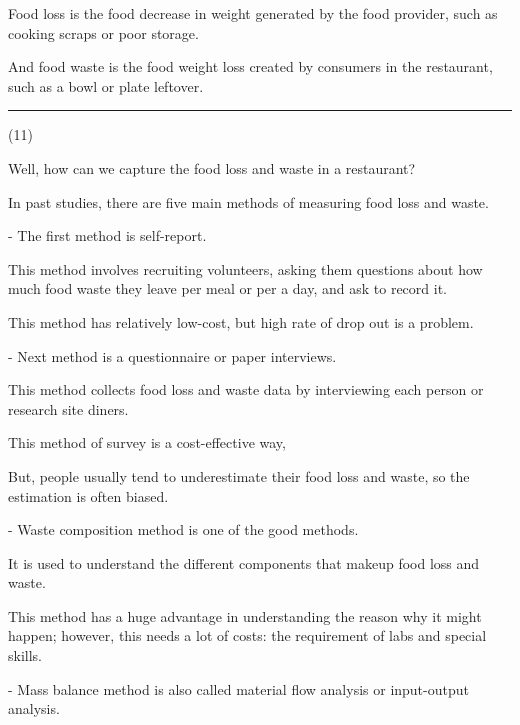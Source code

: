 \documentclass{article}
\begin{document}
\begin{multicols}{2}
\begin{spacing}{1.1}
\vspace{1em}

Food loss is the food decrease in weight generated by the food provider, 
such as cooking scraps or poor storage.

And food waste is the food weight loss created by consumers in the restaurant, 
such as a bowl or plate leftover.

\noindent\rule{0.1\textwidth}{1pt}\small(11)

Well, how can we capture the food loss and waste in a restaurant?

In past studies, 
there are five main methods of measuring food loss and waste.

\vspace{1em}

- The first method is self-report.

This method involves recruiting volunteers, 
asking them questions about 
how much food waste they leave per meal or per a day, and ask to record it.

This method has relatively low-cost, but high rate of drop out is a problem.

\vspace{1em}

- Next method is a questionnaire or paper interviews.

This method collects food loss and waste data by interviewing each person or research site diners.

This method of survey is a cost-effective way,

But, people usually tend to underestimate their food loss and waste, so the estimation is often biased.

\vspace{1em}

- Waste composition method is one of the good methods. 

It is used to understand the different components that makeup food loss and waste.

This method has a huge advantage in understanding the reason why it might happen;
however, this needs a lot of costs: the requirement of labs and special skills.

\vspace{1em}

- Mass balance method is also called material flow analysis or input-output analysis.


\end{spacing}
\end{multicols}
\end{document}
